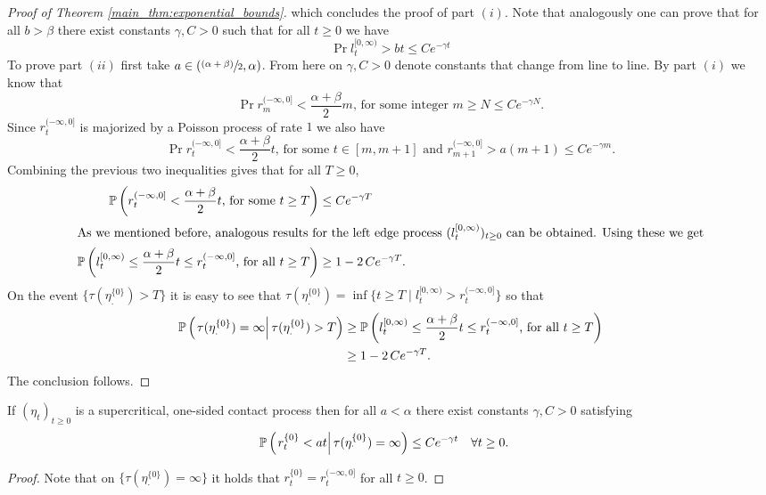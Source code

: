\begin{proof}[Proof of Theorem \ref{main_thm:exponential_bounds}]
which concludes the proof of part $(i)$. Note that analogously one can prove that for all $b > \beta$ there exist constants $\gamma, C > 0$ such that for all $t \geq 0$ we have
\begin{equation}\nonumber
\Pr{l^{[0, \infty)}_t > b t} \leq C e^{-\gamma t}
\end{equation}
To prove part $(ii)$ first take $a \in \left(\sfrac{(\alpha + \beta)}{2}, \alpha \right)$. From here on $\gamma, C > 0$ denote constants that change from line to line. By part $(i)$ we know that
\begin{equation}\nonumber
\Pr{r^{(-\infty, 0]}_m < \frac{\alpha + \beta}{2} m \text{, for some integer $m \geq N$}} \leq C e^{- \gamma N}.
\end{equation}
Since $r^{(-\infty, 0]}_t$ is majorized by a Poisson process of rate $1$ we also have
\begin{equation} \nonumber
\Pr{r^{(-\infty, 0]}_t < \frac{\alpha + \beta}{2} t \text{, for some $t \in [m, m+1]$ and }r^{(-\infty, 0]}_{m + 1} > a(m+1)} \leq C e^{- \gamma m}. 
\end{equation}
Combining the previous two inequalities gives that for all $T \geq 0$, 
\begin{align*}
\Pr{r^{(-\infty, 0]}_t < \frac{\alpha + \beta}{2} t \text{, for some $t \geq T$}} &\leq C e^{- \gamma T} \\
\intertext{As we mentioned before, analogous results for the left edge process $(l^{[0, \infty)}_t)_{t \geq 0}$ can be obtained. Using these we get}
\Pr{l^{[0, \infty)}_t \leq \frac{\alpha + \beta}{2} t \leq r^{(-\infty, 0]}_t \text{, for all $t \geq T$}} &\geq 1 - 2\, C e^{- \gamma T}. \\
\end{align*}
On the event $\{\tau(\eta^{\{0\}}_.) > T\}$ it is easy to see that $\tau(\eta^{\{0\}}_.) = \inf\{ t \geq T \mid l^{[0, \infty)}_t > r^{(- \infty, 0]}_t \}$ so that
\begin{align*}
\PrCond{\tau(\eta^{\{0\}}_.) = \infty}{\tau(\eta^{\{0\}}_.) > T} &\geq \Pr{l^{[0, \infty)}_t \leq \frac{\alpha + \beta}{2} t \leq r^{(-\infty, 0]}_t \text{, for all $t \geq T$}} \\
&\geq 1 - 2\, C e^{- \gamma T}. 
\end{align*}
The conclusion follows. 
\end{proof}

\begin{corollary}\label{cor:durrett}
If $(\eta_t)_{t \geq 0}$ is a supercritical, one-sided contact process then for all $a < \alpha$ there exist constants $\gamma, C > 0$ satisfying 
\begin{align*}\label{eqn:durret_decay}
  \PrCond{r^{\{0\}}_t < a t}{\tau(\eta^{\{0\}}_\cdot) = \infty} &\leq C e^{-\gamma t}  && \forall t \geq 0. 
\end{align*}
\end{corollary}

\begin{proof}
Note that on $\{\tau(\eta^{\{0\}}_\cdot) = \infty \}$ it holds that $r^{\{0\}}_t = r^{(-\infty, 0]}_t$ for all $t \geq 0$. 
\end{proof}